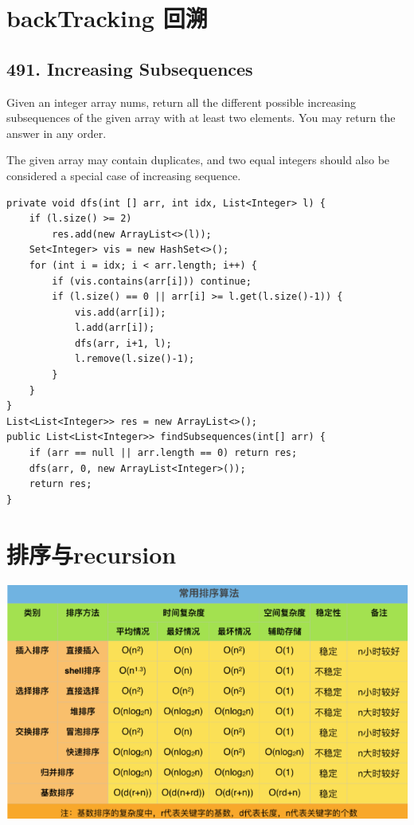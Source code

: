 \documentclass[9pt, b5paper]{article}
\begin{document}
\section{backTracking 回溯}
\label{sec-6}
\subsection{491. Increasing Subsequences}
\label{sec-6-1}
Given an integer array nums, return all the different possible increasing subsequences of the given array with at least two elements. You may return the answer in any order.

The given array may contain duplicates, and two equal integers should also be considered a special case of increasing sequence.
\begin{verbatim}
private void dfs(int [] arr, int idx, List<Integer> l) {
    if (l.size() >= 2)
        res.add(new ArrayList<>(l));
    Set<Integer> vis = new HashSet<>();
    for (int i = idx; i < arr.length; i++) {
        if (vis.contains(arr[i])) continue;
        if (l.size() == 0 || arr[i] >= l.get(l.size()-1)) {
            vis.add(arr[i]);
            l.add(arr[i]);
            dfs(arr, i+1, l);
            l.remove(l.size()-1);
        }
    }
}
List<List<Integer>> res = new ArrayList<>();
public List<List<Integer>> findSubsequences(int[] arr) {
    if (arr == null || arr.length == 0) return res;
    dfs(arr, 0, new ArrayList<Integer>());
    return res;
}
\end{verbatim}


\section{排序与recursion}
\label{sec-7}

\includegraphics[width=.9\linewidth]{./pic/sort.png}
\end{document}
